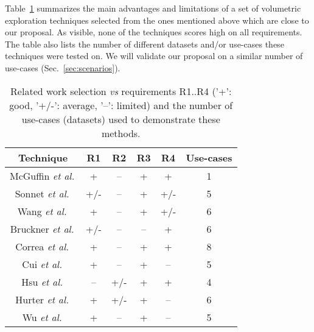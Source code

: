 Table~\ref{tab:methods} summarizes the main advantages and limitations of a set of volumetric exploration techniques selected from the ones mentioned above which are close to our proposal. As visible, none of the techniques scores high on all requirements. The table also lists the number of different datasets and/or use-cases these techniques were tested on. We will validate our proposal on a similar number of use-cases (Sec.~\ref{sec:scenarios}).
\begin{table}[htbp]
\centering
\small
\begin{tabular}{ |c|c|c|c|c|c| }
\hline
\textbf{Technique} & \textbf{R1} & \textbf{R2} & \textbf{R3} & \textbf{R4} & \textbf{Use-cases}\\
\hline
\hline
McGuffin \emph{et al.}\,\cite{1250400} & + & -- & + & + & 1\\
Sonnet \emph{et al.}\,\cite{Sonnet:2004:IEA:989863.989871} & +/- & -- & + & +/- & 5\\
Wang \emph{et al.}\,\cite{1532818} & + & -- & + & +/- & 6\\
Bruckner \emph{et al.}\,\cite{4015467} & +/- & -- & -- & + & 6\\
Correa \emph{et al.}\,\cite{Correa:2007:IDD:1313046.1313163,Correa:2006:FAV:1187627.1187827} & + & -- & + & + & 8\\
Cui \emph{et al.}\,\cite{cui10} & + & -- & + & -- & 5\\
Hsu \emph{et al.}\,\cite{Hsu:2011:RFM:2070781.2024165} & -- & +/- & + & + & 4\\
Hurter \emph{et al.}\,\cite{6787171} & + & +/- & + & -- & 6\\
Wu \emph{et al.}\,\cite{wu16} & + & -- & + & -- & 5\\
\hline
\end{tabular}
\caption{Related work selection \emph{vs} requirements R1..R4 ('+': good, '+/-': average, '--': limited) and the number of use-cases (datasets) used to demonstrate these methods.}
\label{tab:methods}
\end{table}



\vspace{-0.09cm}
